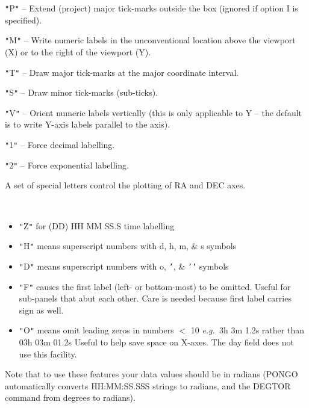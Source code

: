 \documentclass[twoside,11pt]{article}
\renewcommand{\_}{\texttt{\symbol{95}}}
\newcommand{\eg}{{\em e.g.\ }}
\newcommand{\sstitemlist}[1]{
  \mbox{} \\
  \vspace{-3.5ex}
  \begin{itemize}
     #1
  \end{itemize}
}
\newcommand{\sstitem}{\item}
\newcommand{\sstitemlist}[1]{
      \begin{itemize}
         #1
      \end{itemize}
      \\
   }
\newcommand{\sstitem}{\item}
\begin{document}
{{{{            \sstitem
               {\tt "}P{\tt "} -- Extend (project) major tick-marks outside the box
               (ignored if option I is specified).

            \sstitem
               {\tt "}M{\tt "} -- Write numeric labels in the unconventional location
               above the viewport (X) or to the right of the viewport (Y).

            \sstitem
               {\tt "}T{\tt "} -- Draw major tick-marks at the major coordinate
               interval.

            \sstitem
               {\tt "}S{\tt "} -- Draw minor tick-marks (sub-ticks).

            \sstitem
               {\tt "}V{\tt "} -- Orient numeric labels vertically (this is only
               applicable to Y -- the default is to write Y-axis labels
               parallel to the axis).

            \sstitem
               {\tt "}1{\tt "} -- Force decimal labelling.

            \sstitem
               {\tt "}2{\tt "} -- Force exponential labelling.

         }
         A set of special letters control the plotting of RA and DEC
         axes.

         \sstitemlist{

            \sstitem
               {\tt "}Z{\tt "} for (DD) HH MM SS.S time labelling

            \sstitem
               {\tt "}H{\tt "} means superscript numbers with d, h, m, \& s  symbols

            \sstitem
               {\tt "}D{\tt "} means superscript numbers with    o, {\tt '}, \& {\tt '}{\tt '} symbols

            \sstitem
               {\tt "}F{\tt "} causes the first label (left- or bottom-most) to
                     be omitted. Useful for sub-panels that abut each other.
                     Care is needed because first label carries sign as well.

            \sstitem
               {\tt "}O{\tt "} means omit leading zeros in numbers $<$ 10
                     \eg  3h 3m 1.2s rather than 03h 03m 01.2s  Useful
                     to help save space on X-axes. The day field does not
                     use this facility.

         }
         Note that to use these features your data values should be in
         radians (PONGO automatically converts HH:MM:SS.SSS strings to
         radians, and the DEGTOR command from degrees to radians).

}}}
\end{document}
